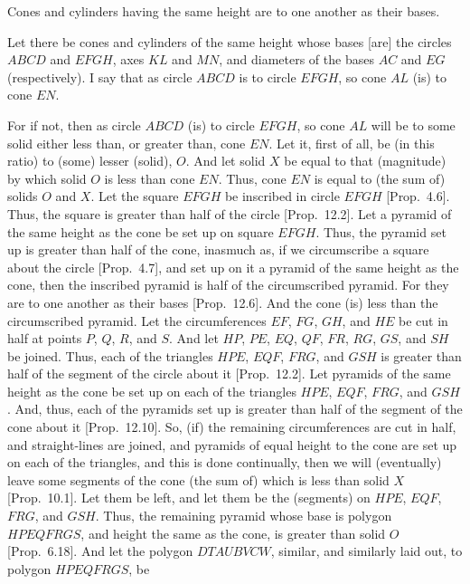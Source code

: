 \begin{Parallel}{}{}
{Cones and cylinders having the same height are to one another as their bases.

Let there be cones and cylinders of the same height whose bases [are]  the circles $ABCD$ and $EFGH$,
axes $KL$ and $MN$, and diameters of the bases $AC$ and $EG$ (respectively). I say that as
circle $ABCD$ is to circle $EFGH$, so cone  $AL$ (is) to cone $EN$.

\epsfysize=1.3in
\centerline{}

For if not, then as circle $ABCD$ (is) to circle $EFGH$, so cone $AL$ will be to some solid either less than, or
greater than, cone $EN$. Let it, first of all, be (in this ratio) to (some) lesser (solid), $O$. And let solid $X$ be equal to
that (magnitude) by which solid $O$ is less than cone $EN$. Thus, cone $EN$ is equal to (the sum of) solids
$O$ and $X$. Let the square $EFGH$ be inscribed in circle $EFGH$ [Prop.~4.6].
Thus, the square is greater than half of the circle [Prop.~12.2]. Let a pyramid
of the same height as the cone be set up on square $EFGH$. Thus, the pyramid set up is
greater than half of the cone, inasmuch as, if we circumscribe a square about the circle [Prop.~4.7], and set up  on it a pyramid of the same height as the cone, then the inscribed pyramid
is half of the circumscribed pyramid.  For they are to one another as their 
bases [Prop.~12.6]. And the cone (is) less than the circumscribed pyramid. 
Let the circumferences $EF$, $FG$, $GH$, and $HE$ be cut in half at points $P$, $Q$, $R$,
and $S$. And let $HP$, $PE$, $EQ$, $QF$, $FR$, $RG$, $GS$, and $SH$ be joined.
Thus, each of the triangles $HPE$, $EQF$, $FRG$, and $GSH$ is greater than half of the segment of
the circle about it [Prop.~12.2]. Let pyramids of the same height
as the cone be set up on each of the triangles $HPE$, $EQF$, $FRG$, and $GSH$.  And, thus, each of
the pyramids set up is greater than half of the segment of the cone about it [Prop.~12.10].
So, (if) the remaining circumferences are cut in half, and straight-lines are joined, and pyramids  of equal height to the cone are
set up on each of the triangles, and this is 
done continually, then we will (eventually) leave some segments of the cone (the sum of) which is less 
than solid $X$ [Prop.~10.1]. Let them be left, and let them be the
(segments) on $HPE$, $EQF$, $FRG$, and $GSH$. Thus, the remaining pyramid whose base is
polygon $HPEQFRGS$, and height the same as the cone, is greater than solid $O$ [Prop.~6.18]. 
And let the polygon $DTAUBVCW$, similar, and similarly laid out, to polygon $HPEQFRGS$, be
}
\end{Parallel}

